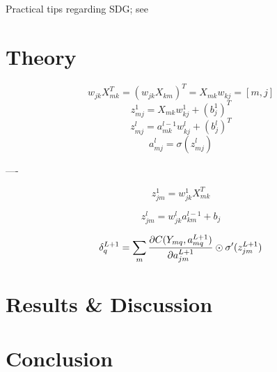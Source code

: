 \documentclass[reprint, english, nofootinbib]{revtex4-2}
\begin{document}
Practical tips regarding SDG; see \textcite[pp~19]{Mehta_2019}
\section{Theory}
    \[
        w_{jk} X_{mk}^T = (w_{jk}X_{km})^T = X_{mk} w_{kj} = [m,j]
    \]
    \[
        z^1_{mj} = X_{mk}w^1_{kj} + (b^1_j)^T
    \]
    \[
        z^l_{mj} = a^{l-1}_{mk}w^{l}_{kj} + (b^l_j)^T
    \]
    \[
        a^l_{mj} = \sigma(z^l_{mj})
    \]

    ----

    \[
        z^1_{jm} = w^1_{jk}X_{mk}^T
    \]

    \[
        z^l_{jm} = w^l_{jk}a^{l-1}_{km} + b_j
    \]

    \[
        \delta^{L+1}_{q} = \sum_m \pdv{C(Y_{mq}, a^{L+1}_{mq})}{a^{L+1}_{jm}} \odot \sigma'(z^{L+1}_{jm})
    \]


\section{Results \& Discussion}
\section{Conclusion}

\onecolumngrid

\newpage
\twocolumngrid
\appendix
\end{document}
